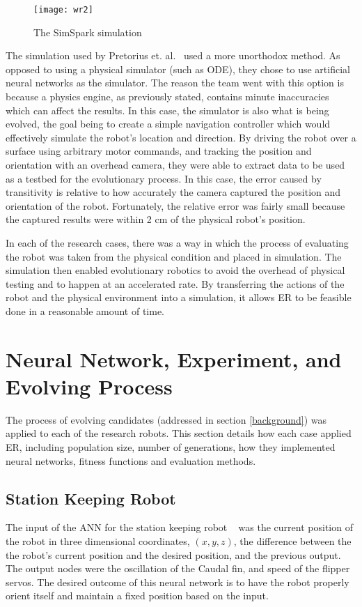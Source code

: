 \documentclass{sig-alternate}
\begin{document}
 \begin{figure}%
 \begin{center}
  \texttt{[image: wr2]}
 \end{center}
\caption{The SimSpark simulation}
\label{fig:simSpark}
\end{figure}
 
 The simulation used by Pretorius et. al.~\cite{Pretorius:2009:TAN:1632149.1632171} used a more unorthodox method. As opposed to using a physical simulator (such as ODE), they chose to use artificial neural networks as the simulator. The reason the team went with this option is because a physics engine, as previously stated, contains minute inaccuracies which can affect the results. In this case, the simulator is also what is being evolved, the goal being to create a simple navigation controller which would effectively simulate the robot's location and direction. By driving the robot over a surface using arbitrary motor commands, and tracking the position and orientation with an overhead camera, they were able to extract data to be used as a testbed for the evolutionary process. In this case, the error caused by transitivity is relative to how accurately the camera captured the position and orientation of the robot. Fortunately, the relative error was fairly small because the captured results were within 2 cm of the physical robot's position. 
 
 In each of the research cases, there was a way in which the process of evaluating the robot was taken from the physical condition and placed in simulation. The simulation then enabled evolutionary robotics to avoid the overhead of physical testing and to happen at an accelerated rate. By transferring the actions of the robot and the physical environment into a simulation, it allows ER to be feasible done in a reasonable amount of time.

\section{Neural Network, Experiment, and Evolving Process}\label{evolution}
  The process of evolving candidates (addressed in section \ref{background}) was applied to each of the research robots. This section details how each case applied ER, including population size, number of generations, how they implemented neural networks, fitness functions and evaluation methods.
  \subsection{Station Keeping Robot}\label{Moore Evolving}
  The input of the ANN for the station keeping robot ~\cite{Moore:2013:ESK:2463372.2463402} was the current position of the robot in three dimensional coordinates, $(x,y,z)$, the difference between the the robot's current position and the desired position, and the previous output. The output nodes were the oscillation of the Caudal fin, and speed of the flipper servos. The desired outcome of this neural network is to have the robot properly orient itself and maintain a fixed position based on the input.
  
\end{document}
